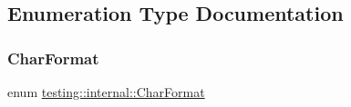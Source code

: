 \subsection{Enumeration Type Documentation}
\mbox{\label{namespacetesting_1_1internal_ae2ef98247c76a50cdc80ceb4a6c81793}} 
\subsubsection{\texorpdfstring{CharFormat}{CharFormat}\hspace{0.1cm}{\footnotesize\ttfamily [1/3]}}
{\footnotesize\ttfamily enum \mbox{\hyperlink{namespacetesting_1_1internal_ae2ef98247c76a50cdc80ceb4a6c81793}{testing\+::internal\+::\+Char\+Format}}}


